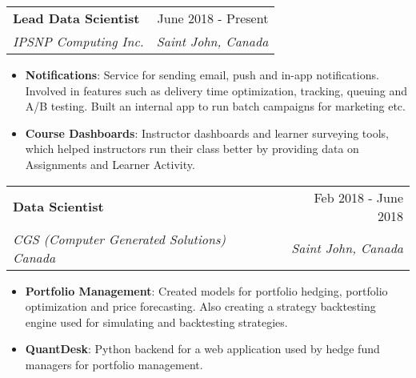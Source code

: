\documentclass[letterpaper,11pt]{article}
\makeatletter
\newcommand{\resumeItem}[2]{
  \item\small{
    \textbf{#1}{: #2 \vspace{-2pt}}
  }
}
\newcommand{\resumeSubheading}[4]{
  \vspace{-1pt}\item
    \begin{tabular*}{0.97\textwidth}{l@{\extracolsep{\fill}}r}
      \textbf{#1} & #2 \\
      \textit{\small#3} & \textit{\small #4} \\
    \end{tabular*}\vspace{-5pt}
}
\newcommand{\resumeItemListStart}{\begin{itemize}}
\newcommand{\resumeItemListEnd}{\end{itemize}\vspace{-5pt}}
\makeatother
\begin{document}
    \resumeSubheading
          {Lead Data Scientist}{June 2018 - Present}
      {IPSNP Computing Inc.}{Saint John, Canada}
      \resumeItemListStart
        \resumeItem{Notifications}
          {Service for sending email, push and in-app notifications. Involved in features such as delivery time optimization, tracking, queuing and A/B testing. Built an internal app to run batch campaigns for marketing etc.}
        \resumeItem{Course Dashboards}
          {Instructor dashboards and learner surveying tools, which helped instructors run their class better by providing data on Assignments and Learner Activity.}
      \resumeItemListEnd

    \resumeSubheading
      {Data Scientist}{Feb 2018 - June 2018}
      {CGS (Computer Generated Solutions) Canada}{Saint John, Canada}
      \resumeItemListStart
        \resumeItem{Portfolio Management}
          {Created models for portfolio hedging,  portfolio optimization and price forecasting. Also creating a strategy backtesting engine used for simulating and backtesting strategies.}
        \resumeItem{QuantDesk}
          {Python backend for a web application used by hedge fund managers for portfolio management.}
      \resumeItemListEnd
\end{document}
